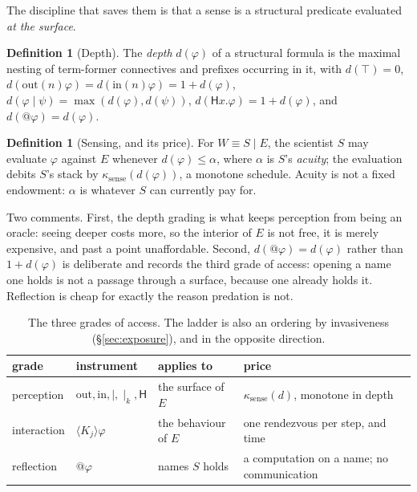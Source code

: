 \documentclass[11pt]{article}
\theoremstyle{plain}
\theoremstyle{definition}
\newtheorem{definition}[theorem]{Definition}
\begin{document}
The discipline that saves them is that a sense is a structural predicate evaluated \emph{at the
surface}.

\begin{definition}[Depth]
The \emph{depth} $d(\varphi)$ of a structural formula is the maximal nesting of term-former
connectives and prefixes occurring in it, with $d(\top) = 0$, $d(\mathrm{out}(n)\varphi) =
d(\mathrm{in}(n)\varphi) = 1 + d(\varphi)$, $d(\varphi \mid \psi) = \max(d(\varphi), d(\psi))$,
$d(\mathsf{H}x.\varphi) = 1 + d(\varphi)$, and $d(@\varphi) = d(\varphi)$.
\end{definition}

\begin{definition}[Sensing, and its price]
\label{def:sense}
For $W \equiv S \mid E$, the scientist $S$ may evaluate $\varphi$ against $E$ whenever
$d(\varphi) \le \alpha$, where $\alpha$ is $S$'s \emph{acuity}; the evaluation debits $S$'s stack by
$\kappa_{\mathrm{sense}}(d(\varphi))$, a monotone schedule. Acuity is not a fixed endowment: $\alpha$
is whatever $S$ can currently pay for.
\end{definition}

Two comments. First, the depth grading is what keeps perception from being an oracle: seeing deeper
costs more, so the interior of $E$ is not free, it is merely expensive, and past a point unaffordable.
Second, $d(@\varphi) = d(\varphi)$ rather than $1 + d(\varphi)$ is deliberate and records the third
grade of access: opening a name one holds is not a passage through a surface, because one already
holds it. Reflection is cheap for exactly the reason predation is not.

\begin{table}[t]
\centering
\begin{tabular}{@{}llll@{}}
\toprule
\textbf{grade} & \textbf{instrument} & \textbf{applies to} & \textbf{price} \\
\midrule
perception & $\mathrm{out}, \mathrm{in}, \mid, \mid_k, \mathsf{H}$ & the surface of $E$ &
$\kappa_{\mathrm{sense}}(d)$, monotone in depth \\
interaction & $\langle K_j \rangle \varphi$ & the behaviour of $E$ & one rendezvous per step, and time \\
reflection & $@\varphi$ & names $S$ holds & a computation on a name; no communication \\
\bottomrule
\end{tabular}
\caption{The three grades of access. The ladder is also an ordering by invasiveness
(\S\ref{sec:exposure}), and in the opposite direction.}
\label{tab:access}
\end{table}
\end{document}
